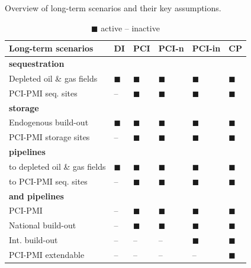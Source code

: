 \documentclass[preprint,12pt,sort&compress]{elsarticle}
\begin{document}
\begin{table}[htbp]
  \centering
  \caption{Overview of long-term scenarios and their key assumptions.}
  \label{tab:long-term_scenarios}
  \scriptsize
  \begin{tabularx}{\textwidth}{R{3.9cm}>{\centering\arraybackslash}X>{\centering\arraybackslash}X>{\centering\arraybackslash}X>{\centering\arraybackslash}X>{\centering\arraybackslash}X}
    \toprule
    \textbf{Long-term scenarios} & 
    \textbf{DI} & 
    \textbf{PCI} & 
    \textbf{PCI-n} & 
    \textbf{PCI-in} & 
    \textbf{CP} \\
    \midrule
    \textbf{ sequestration} & & & & & \\
    Depleted oil \& gas fields & $\blacksquare$ & $\blacksquare$ & $\blacksquare$ & $\blacksquare$ & $\blacksquare$ \\
    PCI-PMI seq. sites & -- & $\blacksquare$ & $\blacksquare$ & $\blacksquare$ & $\blacksquare$ \\
    \midrule
    \textbf{ storage} & & & & & \\
    Endogenous build-out & $\blacksquare$ & $\blacksquare$ & $\blacksquare$ & $\blacksquare$ & $\blacksquare$ \\
    PCI-PMI storage sites & -- & $\blacksquare$ & $\blacksquare$ & $\blacksquare$ & $\blacksquare$ \\
    \midrule
    \textbf{ pipelines} & & & & & \\
    to depleted oil \& gas fields & $\blacksquare$ & $\blacksquare$ & $\blacksquare$ & $\blacksquare$ & $\blacksquare$ \\
    to PCI-PMI seq. sites & -- & $\blacksquare$ & $\blacksquare$ & $\blacksquare$ & $\blacksquare$ \\
    \midrule
    \textbf{ and  pipelines} & & & & & \\
    PCI-PMI & -- & $\blacksquare$ & $\blacksquare$ & $\blacksquare$ & $\blacksquare$ \\
    National build-out & -- & $\blacksquare$ & $\blacksquare$ & $\blacksquare$ & $\blacksquare$ \\
    Int. build-out & -- & -- & -- & $\blacksquare$ & $\blacksquare$ \\
    PCI-PMI extendable & -- & -- & -- & -- & $\blacksquare$ \\

    \bottomrule
  \end{tabularx}
  \caption*{\scriptsize $\blacksquare$ active \quad -- inactive}
\end{table}
\end{document}

